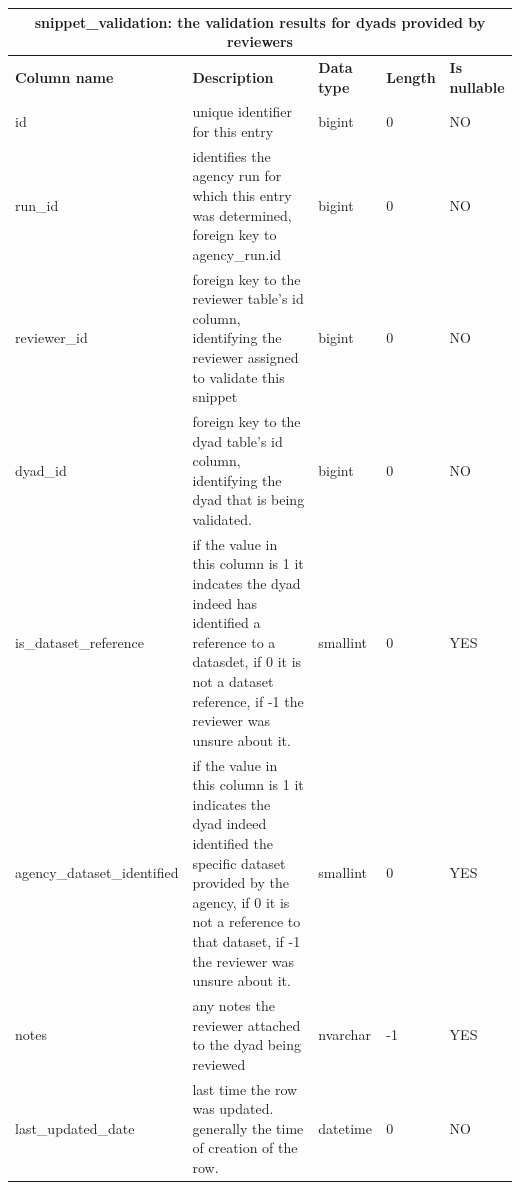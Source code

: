 \documentclass[titlepage, 11pt]{article}
\begin{document}
{\begin{table}[h!]
{\begin{tabularx}{1\textwidth} {|p{4cm}|p{5.33cm}|p{2cm}|p{1.5cm}|p{1.5cm}|}
\end{tabularx}
\label{table: appendix b - reviewer}
}
\end{table}

\begin{table}[h!]

{\renewcommand{\arraystretch}{1.5}%
\begin{tabularx}{1\textwidth} {|p{4.3cm}|p{5.33cm}|p{2cm}|p{1.2cm}|p{1.5cm}|}
 \hline
 \multicolumn{5}{|c|}{\textbf{snippet\_validation: the validation results for dyads provided by reviewers}}\\
 \hline
 \textbf{Column name} & \textbf{Description} & \textbf{Data type} & \textbf{Length} & \textbf{Is nullable} \\
 \hline
 id & unique identifier for this entry & bigint   & 0  & NO  \\
 \hline
 run\_id  & identifies the agency run for which this entry was determined, foreign key to agency\_run.id  & bigint   & 0  & NO  \\
 \hline
 reviewer\_id & foreign key to the reviewer table's id column, identifying the reviewer assigned to validate this snippet & bigint   & 0  & NO  \\
 \hline
 dyad\_id & foreign key to the dyad table's id column, identifying the dyad that is being validated. & bigint   & 0  & NO  \\
 \hline
 is\_dataset\_reference & if the value in this column is 1 it indcates the dyad indeed has identified a reference to a datasdet, if 0 it is not a dataset reference, if -1 the reviewer was unsure about it. & smallint &
  0 & YES \\
  \hline
 agency\_dataset\_identified & if the value in this column is 1 it indicates the dyad indeed identified the specific dataset provided by the agency, if 0 it is not a reference to that dataset, if -1 the reviewer was unsure about it. & smallint & 0 & YES \\
 \hline
 notes & any notes the reviewer attached to the dyad being reviewed & nvarchar & -1 & YES \\
 \hline
 last\_updated\_date & last time the row was updated. generally the time of creation of the row. & datetime & 0  & NO \\
\hline

\end{tabularx}
\label{table: appendix b - snippet validation}
}
\end{table}

\begin{table}[h!]


\end{table}}
\end{document}
